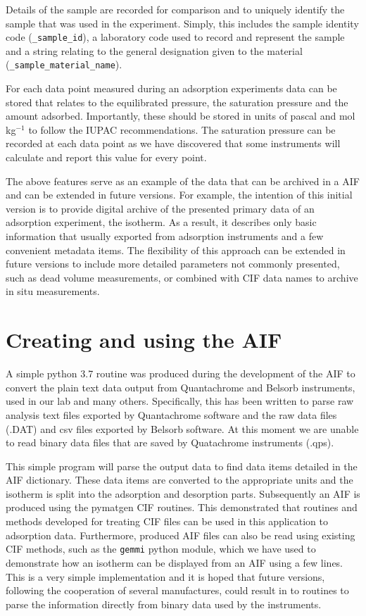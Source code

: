 \documentclass[journal=langd5,manuscript=article]{achemso}
\begin{document}
Details of the sample are recorded for comparison and to uniquely identify the sample that was used in the experiment.
Simply, this includes the sample identity code (\texttt{\_sample\_id}), a laboratory code used to record and represent the sample and a string relating to the general designation given to the material (\texttt{\_sample\_material\_name}).

For each data point measured during an adsorption experiments data can be stored that relates to the equilibrated pressure, the saturation pressure and the amount adsorbed. Importantly, these should be stored in units of pascal and mol$\,$kg$^{-1}$ to follow the IUPAC recommendations.
The saturation pressure can be recorded at each data point as we have discovered that some instruments will calculate and report this value for every point.

The above features serve as an example of the data that can be archived in a AIF and can be extended in future versions.
For example, the intention of this initial version is to provide digital archive of the presented primary data of an adsorption experiment, the isotherm.
As a result, it describes only basic information that usually exported from adsorption instruments and a few convenient metadata items.
The flexibility of this approach can be extended in future versions to include more detailed parameters not commonly presented, such as dead volume measurements, or combined with CIF data names to archive in situ measurements.

\section{Creating and using the AIF}
A simple python 3.7 routine was produced during the development of the AIF to convert the plain text data output from Quantachrome and Belsorb instruments, used in our lab and many others.
Specifically, this has been written to parse raw analysis text files exported by Quantachrome software and the raw data files (.DAT) and csv files exported by Belsorb software.
At this moment we are unable to read binary data files that are saved by Quatachrome instruments (.qps).

This simple program will parse the output data to find data items detailed in the AIF dictionary.
These data items are converted to the appropriate units and the isotherm is split into the adsorption and desorption parts.
Subsequently an AIF is produced using the pymatgen CIF routines.
This demonstrated that routines and methods developed for treating CIF files can be used in this application to adsorption data.
Furthermore, produced AIF files can also be read using existing CIF methods, such as the \texttt{gemmi} python module, which we have used to demonstrate how an isotherm can be displayed from an AIF using a few lines.
This is a very simple implementation and it is hoped that future versions, following the cooperation of several manufactures, could result in to routines to parse the information directly from binary data used by the instruments.
\end{document}
